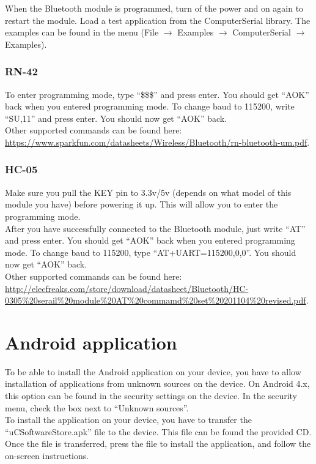 			When the Bluetooth module is programmed, turn of the power and on again to restart the module. Load a test application from the ComputerSerial library. The examples can be found in the menu (File $\rightarrow$ Examples $\rightarrow$ ComputerSerial $\rightarrow$ Examples).
			
				\subsubsection{RN-42}
				To enter programming mode, type ``\$\$\$'' and press enter. You should get ``AOK'' back when you entered programming mode. To change baud to 115200, write ``SU,11'' and press enter. You should now get ``AOK'' back.\\
				
				Other supported commands can be found here: \url{https://www.sparkfun.com/datasheets/Wireless/Bluetooth/rn-bluetooth-um.pdf}.

				\subsubsection{HC-05}
				Make sure you pull the KEY pin to 3.3v/5v (depends on what model of this module you have) before powering it up. This will allow you to enter the programming mode.\\
				
				After you have successfully connected to the Bluetooth module, just write ``AT'' and press enter. You should get ``AOK'' back when you entered programming mode. To change baud to 115200, type ``AT+UART=115200,0,0''. You should now get ``AOK'' back.\\
				
				Other supported commands can be found here: \url{http://elecfreaks.com/store/download/datasheet/Bluetooth/HC-0305%20serail%20module%20AT%20commamd%20set%20201104%20revised.pdf}.
				
	\section{Android application}\label{sec:install-android-application}
	To be able to install the Android application on your device, you have to allow installation of applications from unknown sources on the device. On Android 4.x, this option can be found in the security settings on the device. In the security menu, check the box next to ``Unknown sources''. \\

	To install the application on your device, you have to transfer the ``uCSoftwareStore.apk'' file to the device. This file can be found the provided CD. Once the file is transferred, press the file to install the application, and follow the on-screen instructions.
	
